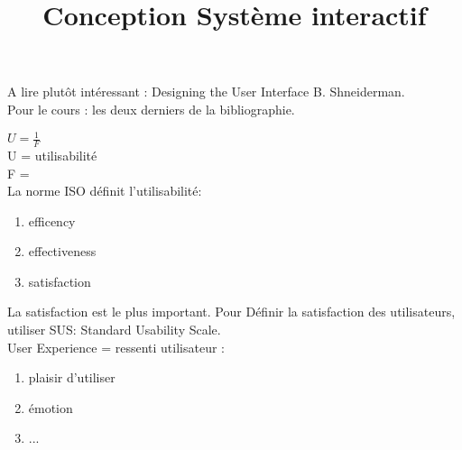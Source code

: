 \documentclass[10pt,a4paper]{article}
\title{Conception Système interactif}
\date{}
\begin{document}
\maketitle

A lire plutôt intéressant : Designing the User Interface B. Shneiderman.\\
Pour le cours : les deux derniers de la bibliographie.

$U = \frac{1}{F}$\\
U = utilisabilité\\
F = \\

La norme ISO définit l'utilisabilité:
\begin{enumerate}
\item efficency
\item effectiveness
\item satisfaction
\end{enumerate}

La satisfaction est le plus important. Pour Définir la satisfaction des utilisateurs, utiliser SUS: Standard Usability Scale.\\
User Experience = ressenti utilisateur :
\begin{enumerate}
\item plaisir d'utiliser
\item émotion
\item ...
\end{enumerate}
\end{document}
